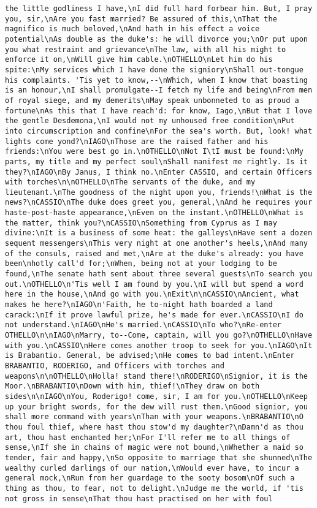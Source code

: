 \begin{verbatim}
the little godliness I have,\nI did full hard forbear him. But, I pray you, sir,\nAre you fast married? Be assured of this,\nThat the magnifico is much beloved,\nAnd hath in his effect a voice potential\nAs double as the duke's: he will divorce you;\nOr put upon you what restraint and grievance\nThe law, with all his might to enforce it on,\nWill give him cable.\nOTHELLO\nLet him do his spite:\nMy services which I have done the signiory\nShall out-tongue his complaints. 'Tis yet to know,--\nWhich, when I know that boasting is an honour,\nI shall promulgate--I fetch my life and being\nFrom men of royal siege, and my demerits\nMay speak unbonneted to as proud a fortune\nAs this that I have reach'd: for know, Iago,\nBut that I love the gentle Desdemona,\nI would not my unhoused free condition\nPut into circumscription and confine\nFor the sea's worth. But, look! what lights come yond?\nIAGO\nThose are the raised father and his friends:\nYou were best go in.\nOTHELLO\nNot I\tI must be found:\nMy parts, my title and my perfect soul\nShall manifest me rightly. Is it they?\nIAGO\nBy Janus, I think no.\nEnter CASSIO, and certain Officers with torches\n\nOTHELLO\nThe servants of the duke, and my lieutenant.\nThe goodness of the night upon you, friends!\nWhat is the news?\nCASSIO\nThe duke does greet you, general,\nAnd he requires your haste-post-haste appearance,\nEven on the instant.\nOTHELLO\nWhat is the matter, think you?\nCASSIO\nSomething from Cyprus as I may divine:\nIt is a business of some heat: the galleys\nHave sent a dozen sequent messengers\nThis very night at one another's heels,\nAnd many of the consuls, raised and met,\nAre at the duke's already: you have been\nhotly call'd for;\nWhen, being not at your lodging to be found,\nThe senate hath sent about three several guests\nTo search you out.\nOTHELLO\n'Tis well I am found by you.\nI will but spend a word here in the house,\nAnd go with you.\nExit\n\nCASSIO\nAncient, what makes he here?\nIAGO\n'Faith, he to-night hath boarded a land carack:\nIf it prove lawful prize, he's made for ever.\nCASSIO\nI do not understand.\nIAGO\nHe's married.\nCASSIO\nTo who?\nRe-enter OTHELLO\n\nIAGO\nMarry, to--Come, captain, will you go?\nOTHELLO\nHave with you.\nCASSIO\nHere comes another troop to seek for you.\nIAGO\nIt is Brabantio. General, be advised;\nHe comes to bad intent.\nEnter BRABANTIO, RODERIGO, and Officers with torches and weapons\n\nOTHELLO\nHolla! stand there!\nRODERIGO\nSignior, it is the Moor.\nBRABANTIO\nDown with him, thief!\nThey draw on both sides\n\nIAGO\nYou, Roderigo! come, sir, I am for you.\nOTHELLO\nKeep up your bright swords, for the dew will rust them.\nGood signior, you shall more command with years\nThan with your weapons.\nBRABANTIO\nO thou foul thief, where hast thou stow'd my daughter?\nDamn'd as thou art, thou hast enchanted her;\nFor I'll refer me to all things of sense,\nIf she in chains of magic were not bound,\nWhether a maid so tender, fair and happy,\nSo opposite to marriage that she shunned\nThe wealthy curled darlings of our nation,\nWould ever have, to incur a general mock,\nRun from her guardage to the sooty bosom\nOf such a thing as thou, to fear, not to delight.\nJudge me the world, if 'tis not gross in sense\nThat thou hast practised on her with foul 
\end{verbatim}
